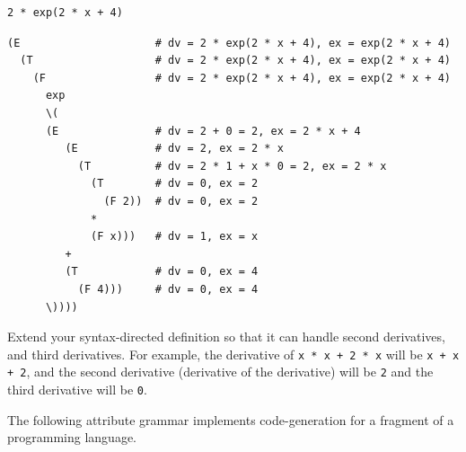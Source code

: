 \documentclass[12pt]{article}
\begin{document}
\begin{exe}
\begin{xlist}
{\begin{soln}
\begin{verbatim}
2 * exp(2 * x + 4)
\end{verbatim}

\begin{verbatim}
(E                     # dv = 2 * exp(2 * x + 4), ex = exp(2 * x + 4)
  (T                   # dv = 2 * exp(2 * x + 4), ex = exp(2 * x + 4)
    (F                 # dv = 2 * exp(2 * x + 4), ex = exp(2 * x + 4)
      exp 
      \( 
      (E               # dv = 2 + 0 = 2, ex = 2 * x + 4
         (E            # dv = 2, ex = 2 * x
           (T          # dv = 2 * 1 + x * 0 = 2, ex = 2 * x
             (T        # dv = 0, ex = 2
               (F 2))  # dv = 0, ex = 2
             *
             (F x)))   # dv = 1, ex = x
         +
         (T            # dv = 0, ex = 4
           (F 4)))     # dv = 0, ex = 4
      \))))
\end{verbatim}
\end{soln}
}

{ Extend your syntax-directed definition so that it can handle second derivatives, and third derivatives. For example, the derivative of {\tt x * x + 2 * x} will be {\tt x + x + 2}, and the second derivative (derivative of the derivative) will be {\tt 2} and the third derivative will be {\tt 0}.
}

\end{xlist}

\newpage

\ex The following attribute grammar implements code-generation for a fragment
of a programming language.


\end{exe}
\end{document}
